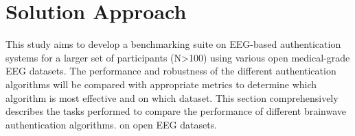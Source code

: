 \chapter{Solution Approach}
\label{ch:Solution Approach}

This study aims to develop a benchmarking suite on EEG-based authentication
systems for a larger set of participants (N>100) using various open medical-grade EEG
datasets. The performance and robustness of the different authentication algorithms will be compared with appropriate metrics to determine which algorithm is most effective and on which dataset. This section comprehensively describes the tasks performed to compare the performance of different brainwave authentication algorithms.
on open EEG datasets.

